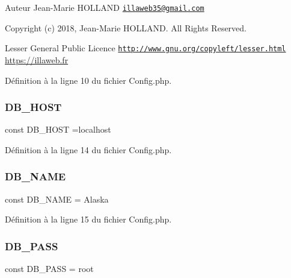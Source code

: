 \begin{DoxyAuthor}{Auteur}
Jean-\/\+Marie H\+O\+L\+L\+A\+ND \href{mailto:illaweb35@gmail.com}{\tt illaweb35@gmail.\+com} 
\end{DoxyAuthor}
\begin{DoxyCopyright}{Copyright}
(c) 2018, Jean-\/\+Marie H\+O\+L\+L\+A\+ND. All Rights Reserved.
\end{DoxyCopyright}
Lesser General Public Licence \href{http://www.gnu.org/copyleft/lesser.html}{\tt http\+://www.\+gnu.\+org/copyleft/lesser.\+html} \hyperlink{}{https\+://illaweb.\+fr}

Définition à la ligne 10 du fichier Config.\+php.

\mbox{\label{_config_8php_a293363d7988627f671958e2d908c202a}} 
\subsubsection{\texorpdfstring{D\+B\+\_\+\+H\+O\+ST}{DB\_HOST}}
{\footnotesize\ttfamily const D\+B\+\_\+\+H\+O\+ST =\textquotesingle{}localhost\textquotesingle{}}



Définition à la ligne 14 du fichier Config.\+php.

\mbox{\label{_config_8php_ab5db0d3504f917f268614c50b02c53e2}} 
\subsubsection{\texorpdfstring{D\+B\+\_\+\+N\+A\+ME}{DB\_NAME}}
{\footnotesize\ttfamily const D\+B\+\_\+\+N\+A\+ME = \textquotesingle{}Alaska\textquotesingle{}}



Définition à la ligne 15 du fichier Config.\+php.

\mbox{\label{_config_8php_a8bb9c4546d91667cfa61879d83127a92}} 
\subsubsection{\texorpdfstring{D\+B\+\_\+\+P\+A\+SS}{DB\_PASS}}
{\footnotesize\ttfamily const D\+B\+\_\+\+P\+A\+SS = \textquotesingle{}root\textquotesingle{}}



